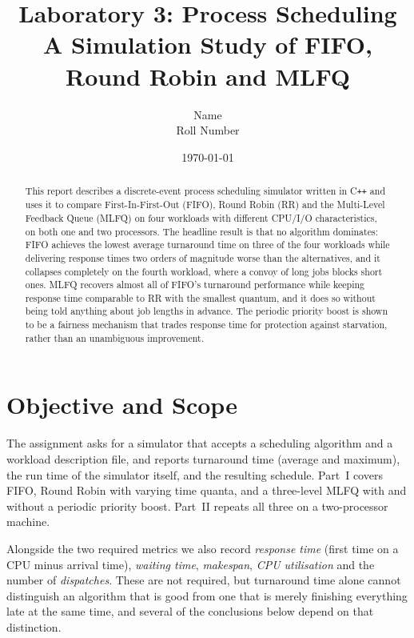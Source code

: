 \documentclass[11pt,a4paper]{article}
\title{\textbf{Laboratory 3: Process Scheduling}\\[0.3em]
       \large A Simulation Study of FIFO, Round Robin and MLFQ}
\author{%
        Name \\ Roll Number}
\date{\today}
\begin{document}
\maketitle

\begin{abstract}
\noindent
This report describes a discrete-event process scheduling simulator written in
C\texttt{++} and uses it to compare First-In-First-Out (FIFO), Round Robin (RR)
and the Multi-Level Feedback Queue (MLFQ) on four workloads with different
CPU/I/O characteristics, on both one and two processors. The headline result is
that no algorithm dominates: FIFO achieves the lowest average turnaround time on
three of the four workloads while delivering response times two orders of
magnitude worse than the alternatives, and it collapses completely on the fourth
workload, where a convoy of long jobs blocks short ones. MLFQ recovers almost all
of FIFO's turnaround performance while keeping response time comparable to RR
with the smallest quantum, and it does so without being told anything about job
lengths in advance. The periodic priority boost is shown to be a fairness
mechanism that trades response time for protection against starvation, rather
than an unambiguous improvement.
\end{abstract}

\tableofcontents
\newpage

\section{Objective and Scope}

The assignment asks for a simulator that accepts a scheduling algorithm and a
workload description file, and reports turnaround time (average and maximum),
the run time of the simulator itself, and the resulting schedule. Part~I covers
FIFO, Round Robin with varying time quanta, and a three-level MLFQ with and
without a periodic priority boost. Part~II repeats all three on a
two-processor machine.

Alongside the two required metrics we also record \emph{response time} (first
time on a CPU minus arrival time), \emph{waiting time}, \emph{makespan},
\emph{CPU utilisation} and the number of \emph{dispatches}. These are not
required, but turnaround time alone cannot distinguish an algorithm that is
good from one that is merely finishing everything late at the same time, and
several of the conclusions below depend on that distinction.
\end{document}

